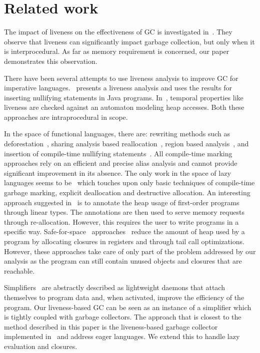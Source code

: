 \documentclass[9pt,preprint,nonatbib]{sigplanconf}
\begin{document}
\section{Related work} 
\label{sec:relatedwork}
The impact of  liveness on the effectiveness of  GC is
investigated in~\cite{Hirzel}.   They observe that  liveness can
significantly  impact   garbage  collection,  but  only   when  it  is
interprocedural.  As far as memory requirement is concerned, our paper
demonstrates this observation.

There have been  several attempts to use liveness  analysis to improve
GC for imperative  languages.~\cite{khedker07heap} presents a liveness
analysis and uses  the results for inserting  nullifying statements in
Java  programs. In~\cite{ran.shaham-sas03},  temporal properties  like
liveness  are checked  against an  automaton modeling  heap accesses.
Both these approaches are intraprocedural in scope.

In the space of functional languages, there are: rewriting methods
such as
deforestation~\cite{wadler88deforest,gill93ashort,chitil99deforest},
sharing analysis based reallocation~\cite{jones89compile}, region
based analysis~\cite{tofte98region}, and insertion of compile-time
nullifying statements~\cite{inoue88analysis, lee05static}.  All compile-time
marking approaches rely on an efficient and precise alias analysis and
cannot provide significant improvement in its absence. The only work
in the space of lazy languages seems to be~\cite{Hamilton}
which touches upon only basic techniques of compile-time garbage
marking, explicit deallocation and destructive allocation. An
interesting approach suggested in~\cite{HofmannJ03} is to annotate the
heap usage of first-order programs through linear types.  The
annotations are then used to serve memory requests through
re-allocation.  However, this requires the user to write programs in a
specific way.
%
Safe-for-space~\cite{appel.cps}              approaches~\cite{Clinger,
  shao00efficient}  reduce the  amount of  heap used  by a  program by
allocating   closures    in   registers   and   through    tail   call
optimizations. However, these approaches take care of only part of the
problem addressed  by our  analysis as the  program can  still contain
unused objects and closures that are reachable.
%

Simplifiers~\cite{ONeill}  are  abstractly  described  as  lightweight
daemons that  attach themselves to  program data and,  when activated,
improve the  efficiency of the  program. Our liveness-based GC  can be
seen as  an instance  of a  simplifier which  is tightly  coupled with
garbage  collectors.   The approach  that  is  closest to  the  method
described  in  this  paper  is the  liveness-based  garbage  collector
implemented  in~\cite{karkare07liveness,asati14lgc} and  address eager
languages. We extend this to handle lazy evaluation and closures.
 
\end{document}
